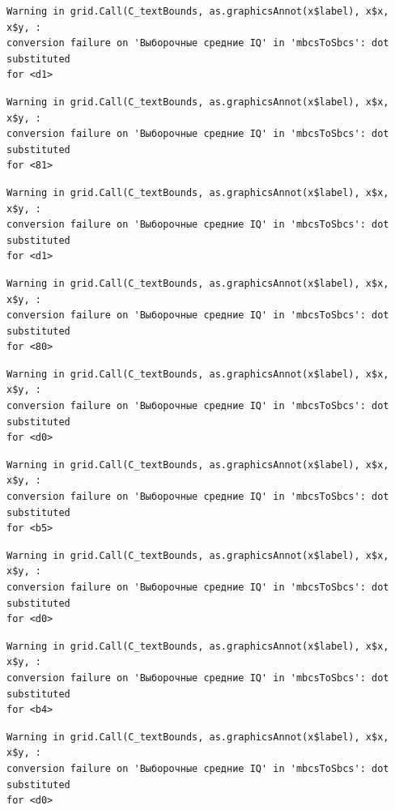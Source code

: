 \documentclass[
  letterpaper,
]{scrbook}
\theoremstyle{definition}
\theoremstyle{remark}
\begin{document}
\begin{verbatim}
Warning in grid.Call(C_textBounds, as.graphicsAnnot(x$label), x$x, x$y, :
conversion failure on 'Выборочные средние IQ' in 'mbcsToSbcs': dot substituted
for <d1>
\end{verbatim}

\begin{verbatim}
Warning in grid.Call(C_textBounds, as.graphicsAnnot(x$label), x$x, x$y, :
conversion failure on 'Выборочные средние IQ' in 'mbcsToSbcs': dot substituted
for <81>
\end{verbatim}

\begin{verbatim}
Warning in grid.Call(C_textBounds, as.graphicsAnnot(x$label), x$x, x$y, :
conversion failure on 'Выборочные средние IQ' in 'mbcsToSbcs': dot substituted
for <d1>
\end{verbatim}

\begin{verbatim}
Warning in grid.Call(C_textBounds, as.graphicsAnnot(x$label), x$x, x$y, :
conversion failure on 'Выборочные средние IQ' in 'mbcsToSbcs': dot substituted
for <80>
\end{verbatim}

\begin{verbatim}
Warning in grid.Call(C_textBounds, as.graphicsAnnot(x$label), x$x, x$y, :
conversion failure on 'Выборочные средние IQ' in 'mbcsToSbcs': dot substituted
for <d0>
\end{verbatim}

\begin{verbatim}
Warning in grid.Call(C_textBounds, as.graphicsAnnot(x$label), x$x, x$y, :
conversion failure on 'Выборочные средние IQ' in 'mbcsToSbcs': dot substituted
for <b5>
\end{verbatim}

\begin{verbatim}
Warning in grid.Call(C_textBounds, as.graphicsAnnot(x$label), x$x, x$y, :
conversion failure on 'Выборочные средние IQ' in 'mbcsToSbcs': dot substituted
for <d0>
\end{verbatim}

\begin{verbatim}
Warning in grid.Call(C_textBounds, as.graphicsAnnot(x$label), x$x, x$y, :
conversion failure on 'Выборочные средние IQ' in 'mbcsToSbcs': dot substituted
for <b4>
\end{verbatim}

\begin{verbatim}
Warning in grid.Call(C_textBounds, as.graphicsAnnot(x$label), x$x, x$y, :
conversion failure on 'Выборочные средние IQ' in 'mbcsToSbcs': dot substituted
for <d0>
\end{verbatim}
\end{document}

